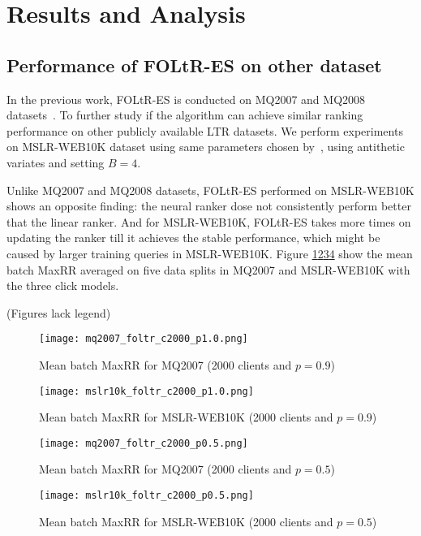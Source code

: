 \section{Results and Analysis}



\subsection{Performance of FOLtR-ES on other dataset}

In the previous work, FOLtR-ES is conducted on MQ2007 and MQ2008 datasets~\cite{kharitonov2019federated}. To further study if the algorithm can achieve similar ranking performance on other publicly available LTR datasets. We perform experiments on MSLR-WEB10K dataset using same parameters chosen by~\cite{kharitonov2019federated}, using antithetic variates and setting $B = 4$. 

Unlike MQ2007 and MQ2008 datasets, FOLtR-ES performed on MSLR-WEB10K shows an opposite finding: the neural ranker dose not consistently perform better that the linear ranker. And for MSLR-WEB10K, FOLtR-ES takes more times on updating the ranker till it achieves the stable performance, which might be caused by larger training queries in MSLR-WEB10K. Figure \ref{fig: mq2007-rq1-1.0}\ref{fig: mslr-rq1-1.0}\ref{fig: mq2007-rq1-0.5}\ref{fig: mslr-rq1-0.5} show the mean batch MaxRR averaged on five data splits in MQ2007 and MSLR-WEB10K with the three click models.

(Figures lack legend)
\begin{figure}[H]
	\centering
	\texttt{[image: mq2007\_foltr\_c2000\_p1.0.png]}
	\caption{Mean batch MaxRR for MQ2007 (2000 clients and $p = 0.9$)}
	\label{fig: mq2007-rq1-1.0}
\end{figure}
\begin{figure}[H]
	\centering
	\texttt{[image: mslr10k\_foltr\_c2000\_p1.0.png]}
	\caption{Mean batch MaxRR for MSLR-WEB10K (2000 clients and $p = 0.9$)}
	\label{fig: mslr-rq1-1.0}
\end{figure}

\begin{figure}[H]
	\centering
	\texttt{[image: mq2007\_foltr\_c2000\_p0.5.png]}
	\caption{Mean batch MaxRR for MQ2007 (2000 clients and $p = 0.5$)}
	\label{fig: mq2007-rq1-0.5}
\end{figure}
\begin{figure}[H]
	\centering
	\texttt{[image: mslr10k\_foltr\_c2000\_p0.5.png]}
	\caption{Mean batch MaxRR for MSLR-WEB10K (2000 clients and $p = 0.5$)}
	\label{fig: mslr-rq1-0.5}
\end{figure}

